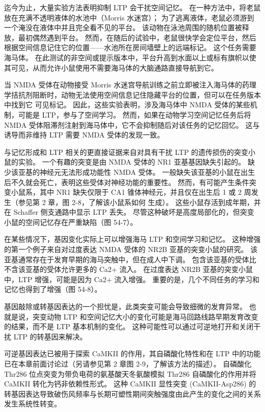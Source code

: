 迄今为止，大量实验方法表明抑制 LTP 会干扰空间记忆。 在一种方法中，将老鼠放在充满不透明液体的水池中（Morris 水迷宫）； 为了逃离液体，老鼠必须游到一个淹没在液体中并且完全看不见的平台。 该动物在泳池周围的随机位置被释放，最初偶然遇到平台。 然而，在随后的试验中，老鼠很快学会定位平台，然后根据空间信息记住它的位置——水池所在房间墙壁上的远端标记。 这个任务需要海马体。 在此测试的非空间或提示版本中，平台升高到水面以上或标有旗帜以使其可见，从而允许小鼠使用不需要海马体的大脑通路直接导航到它。

当 NMDA 受体在动物接受 Morris 水迷宫导航训练之前立即被注入海马体的药理学拮抗剂阻断时，动物无法使用空间信息记住隐藏平台的位置，但可以在任务版本中找到它 可见标记。 因此，这些实验表明，涉及海马体中 NMDA 受体的某些机制，可能是 LTP，参与了空间学习。 然而，如果在动物学习空间记忆任务后将 NMDA 受体阻滞剂注射到海马体中，它不会抑制随后对该任务的记忆回忆。 这与诱导而非维持 LTP 需要 NMDA 受体的发现一致。

与记忆形成和 LTP 相关的更直接证据来自对具有干扰 LTP 的遗传损伤的突变小鼠的实验。 一个有趣的突变是由 NMDA 受体的 NR1 亚基基因缺失引起的。 缺少该亚基的神经元无法形成功能性 NMDA 受体。 一般缺失该亚基的小鼠在出生后不久就会死亡，表明这些受体对神经功能的重要性。 然而，有可能产生条件突变小鼠系，其中 NR1 缺失仅限于 CA1 锥体神经元，并且仅在出生后 1 或 2 周发生（参见第 2 章，图 2-8，了解该小鼠系如何 生成）。 这些小鼠存活到成年期，并在 Schaffer 侧支通路中显示 LTP 丢失。 尽管这种破坏是高度局部化的，但突变小鼠的空间记忆存在严重缺陷（图 54-7）。

在某些情况下，基因变化实际上可以增强海马 LTP 和空间学习和记忆。 这种增强的第一个例子来自对过度表达 NMDA 受体的 NR2B 亚基的突变小鼠的研究。 该亚基通常存在于发育早期的海马突触中，但在成人中下调。 包含该亚基的受体比不含该亚基的受体允许更多的 Ca2+ 流入。 在过度表达 NR2B 亚基的突变小鼠中，LTP 增强，可能是因为 Ca2+ 流入增强。 重要的是，几个不同任务的学习和记忆也得到了增强（图 54-8）。

基因敲除或转基因表达的一个担忧是，此类突变可能会导致细微的发育异常。 也就是说，突变动物 LTP 和空间记忆大小的变化可能是海马回路线路早期发育改变的结果，而不是 LTP 基本机制的变化。 这种可能性可以通过可逆地打开和关闭干扰 LTP 的转基因来解决。

可逆基因表达已被用于探索 CaMKII 的作用，其自磷酸化特性和在 LTP 中的功能已在本章前面讨论过（另请参见第 2 章图 2-9，了解该方法的描述）。 自磷酸化 Thr286 位点突变为带负电荷的氨基酸天冬氨酸模拟 Thr286 自磷酸化的作用并将 CaMKII 转化为钙非依赖性形式。 这种 CaMKII 显性突变 (CaMKII-Asp286) 的转基因表达导致破伤风频率与长期可塑性期间突触强度由此产生的变化之间的关系发生系统性转变。

